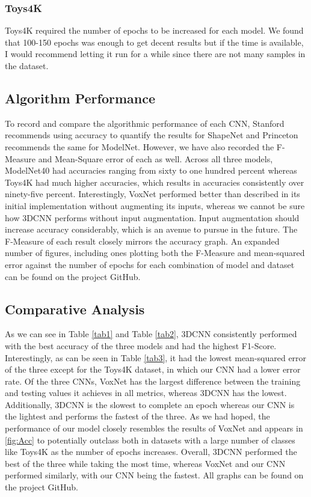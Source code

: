 \documentclass[conference]{IEEEtran}
\begin{document}
\subsubsection{Toys4K}
Toys4K required the number of epochs to be increased for each model. We found that 100-150 epochs was enough to get decent results but if the time is available, I would recommend letting it run for a while since there are not many samples in the dataset.

\subsection{Algorithm Performance}

To record and compare the algorithmic performance of each CNN, Stanford recommends using accuracy to quantify the results for ShapeNet and Princeton recommends the same for ModelNet. However, we have also recorded the F-Measure and Mean-Square error of each as well. Across all three models, ModelNet40 had accuracies ranging from sixty to one hundred percent whereas Toys4K had much higher accuracies, which results in accuracies consistently over ninety-five percent. Interestingly, VoxNet performed better than described in its initial implementation without augmenting its inputs\cite{7353481}, whereas we cannot be sure how 3DCNN performs without input augmentation\cite{gwak20153d}. Input augmentation should increase accuracy considerably, which is an avenue to pursue in the future. The F-Measure of each result closely mirrors the accuracy graph. An expanded number of figures, including ones plotting both the F-Measure and mean-squared error against the number of epochs for each combination of model and dataset can be found on the project GitHub.

\subsection{Comparative Analysis}

As we can see in Table \ref{tab1} and Table \ref{tab2}, 3DCNN consistently performed with the best accuracy of the three models and had the highest F1-Score. Interestingly, as can be seen in Table \ref{tab3}, it had the lowest mean-squared error of the three except for the Toys4K dataset, in which our CNN had a lower error rate. Of the three CNNs, VoxNet has the largest difference between the training and testing values it achieves in all metrics, whereas 3DCNN has the lowest. Additionally, 3DCNN is the slowest to complete an epoch whereas our CNN is the lightest and performs the fastest of the three. As we had hoped, the performance of our model closely resembles the results of VoxNet and appears in \ref{fig:Acc} to potentially outclass both in datasets with a large number of classes like Toys4K as the number of epochs increases. Overall, 3DCNN performed the best of the three while taking the most time, whereas VoxNet and our CNN performed similarly, with our CNN being the fastest. All graphs can be found on the project GitHub.
\end{document}
